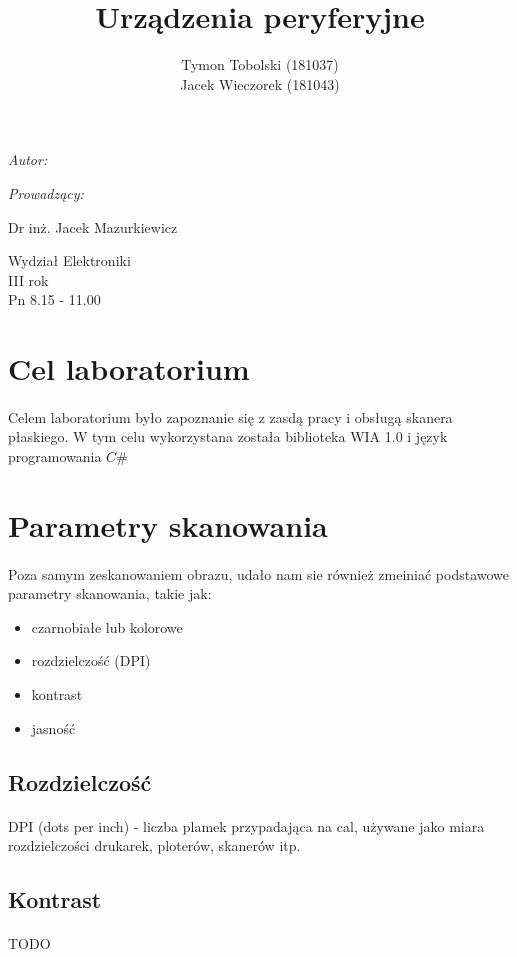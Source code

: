 \documentclass[wide,a4paper,titlepage,12pt] {article}
\title{Urządzenia peryferyjne}
\author{Tymon Tobolski (181037)\\ Jacek Wieczorek (181043)}
\makeatletter
\renewcommand{\maketitle}{
\begin{titlepage}
  \begin{center}
    \vspace*{3cm}
    \LARGE \@title \par
    \vspace{2cm}
    \textit{\small Autor:}\par
    \normalsize \@author\par \normalsize
    \vspace{3cm}
    \textit{\small Prowadzący:}\par
    Dr inż. Jacek Mazurkiewicz \par
    \vspace{2cm}
    Wydział Elektroniki\\ III rok\\ Pn 8.15 - 11.00\par
    \vspace{4cm}
    \small \@date
  \end{center}
\end{titlepage}
}
\makeatother
\begin{document}
\maketitle

\section{Cel laboratorium}
\paragraph{}
Celem laboratorium było zapoznanie się z zasdą pracy i obsługą skanera płaskiego. W tym celu wykorzystana została biblioteka WIA 1.0 i język programowania $C\#$

\section{Parametry skanowania}
\paragraph{} %
Poza samym zeskanowaniem obrazu, udało nam sie również zmeiniać podstawowe parametry skanowania, takie jak:
\begin{itemize}
    \item czarnobiałe lub kolorowe
    \item rozdzielczość (DPI)
    \item kontrast
    \item jasność
\end{itemize}

\subsection{Rozdzielczość}
\paragraph{}
DPI (dots per inch) - liczba plamek przypadająca na cal, używane jako miara rozdzielczości drukarek, ploterów, skanerów itp. 

\subsection{Kontrast}
\paragraph{} %
\label{par:}
TODO
\end{document}
